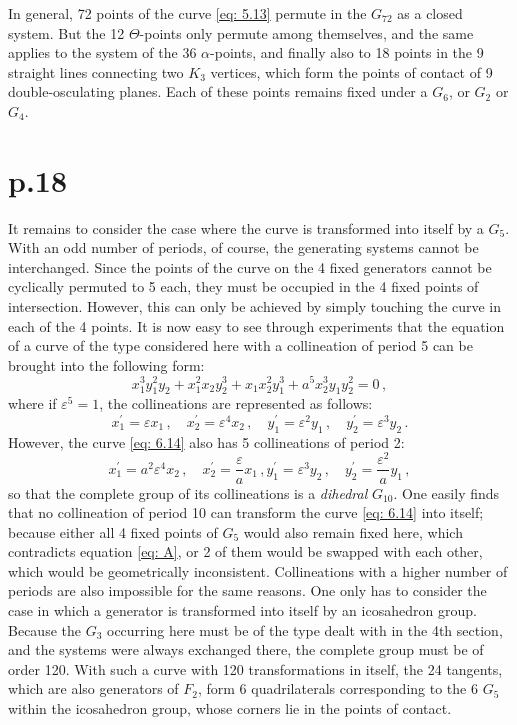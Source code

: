 \documentclass[leqno]{article}
\begin{document}
In general, 72 points of the curve \eqref{eq: 5.13} permute in the $G_{72}$ as a closed system. But the 12 $\Theta$-points only permute among themselves, and the same applies to the system of the 36 $\alpha$-points, and finally also to 18 points in the 9 straight lines connecting two $K_3$ vertices, which form the points of contact of 9 double-osculating planes. Each of these points remains fixed under a $G_6$, or $G_2$ or $G_4$. 
\section{p.18}
It remains to consider the case where the curve is transformed into itself by a $G_5$. With an odd number of periods, of course, the generating systems cannot be interchanged. Since the points of the curve on the 4 fixed generators cannot be cyclically permuted to 5 each, they must be occupied in the 4 fixed points of intersection. However, this can only be achieved by simply touching the curve in each of the 4 points. It is now easy to see through experiments that the equation of a curve of the type considered here with a collineation of period 5 can be brought into the following form: 
\begin{equation}\label{eq: 6.14}
x_1^3 y_1^2 y_2 + x_1^2 x_2 y_2^3  + x_1 x_2^2 y_1^3 + a^5 x_2^3 y_1 y_2^2 = 0 \, , \tag{14}
\end{equation}
where if $\varepsilon^5=1 $, the collineations are represented as follows:
\[
x_1^\prime = \varepsilon x_1 \, , \quad x_2^\prime = \varepsilon^4 x_2 \, , \quad y_1^\prime = \varepsilon^2 y_1 \, , \quad y_2^\prime = \varepsilon^3 y_2 \, . 
\]
However, the curve \eqref{eq: 6.14} also has 5 collineations of period 2: 
\[
x_1^\prime = a^2 \varepsilon^4 x_2 \, , \quad x_2^\prime = \frac{\varepsilon}{a} x_1 \, , y_1^\prime = \varepsilon^3 y_2 \, , \quad y_2^\prime = \frac{\varepsilon^2}{a} y_1 \, , 
\]
so that the complete group of its collineations is a \textit{dihedral} $G_{10}$. One easily finds that no collineation of period 10 can transform the curve \eqref{eq: 6.14} into itself; because either all 4 fixed points of $G_5$ would also remain fixed here, which contradicts equation \eqref{eq: A}, or 2 of them would be swapped with each other, which would be geometrically inconsistent. Collineations with a higher number of periods are also impossible for the same reasons. One only has to consider the case in which a generator is transformed into itself by an icosahedron group. Because the $G_3$ occurring here must be of the type dealt with in the 4th section, and the systems were always exchanged there, the complete group must be of order 120. With such a curve with 120 transformations in itself, the 24 tangents, which are also generators of $F_2$, form 6 quadrilaterals corresponding to the 6 $G_5$ within the icosahedron group, whose corners lie in the points of contact. \\
\end{document}
